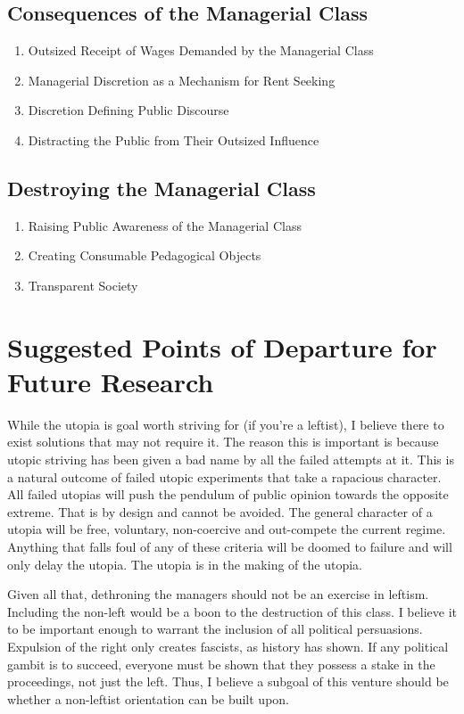 \documentclass[12pt]{article}
\begin{document}
\subsection{Consequences of the Managerial Class}
\begin{enumerate}
    \item Outsized Receipt of Wages Demanded by the Managerial Class
    \item Managerial Discretion as a Mechanism for Rent Seeking
    \item Discretion Defining Public Discourse
    \item Distracting the Public from Their Outsized Influence
\end{enumerate}
\subsection{Destroying the Managerial Class}
\begin{enumerate}
    \item Raising Public Awareness of the Managerial Class
    \item Creating Consumable Pedagogical Objects
    \item Transparent Society
\end{enumerate}

\section{Suggested Points of Departure for Future Research}
While the utopia is goal worth striving for (if you're a leftist), I believe there to exist solutions that may not require it.
The reason this is important is because utopic striving has been given a bad name by all the failed attempts at it.
This is a natural outcome of failed utopic experiments that take a rapacious character.
All failed utopias will push the pendulum of public opinion towards the opposite extreme.
That is by design and cannot be avoided.
The general character of a utopia will be free, voluntary, non-coercive and out-compete the current regime.
Anything that falls foul of any of these criteria will be doomed to failure and will only delay the utopia.
The utopia is in the making of the utopia.

Given all that, dethroning the managers should not be an exercise in leftism.
Including the non-left would be a boon to the destruction of this class.
I believe it to be important enough to warrant the inclusion of all political persuasions.
Expulsion of the right only creates fascists, as history has shown.
If any political gambit is to succeed, everyone must be shown that they possess a stake in the proceedings, not just the left.
Thus, I believe a subgoal of this venture should be whether a non-leftist orientation can be built upon.
\end{document}
